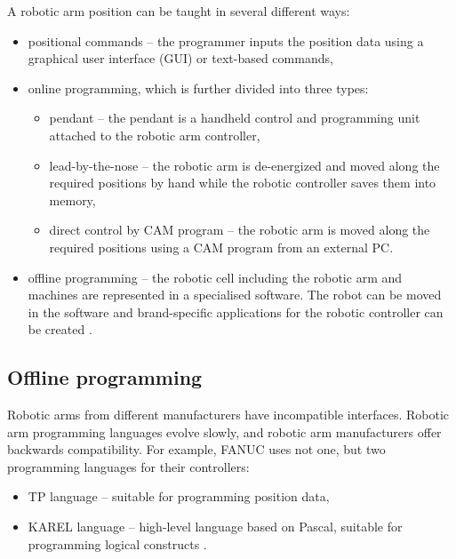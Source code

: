 A robotic arm position can be taught in several different ways:

\begin{itemize}
    \item positional commands -- the programmer inputs the position data using a graphical user interface (GUI) or text-based commands,
    
    \item online programming, which is further divided into three types:
    
    \begin{itemize}
    
    \item pendant -- the pendant is a handheld control and programming unit attached to the robotic arm controller,
    \item lead-by-the-nose -- the robotic arm is de-energized and moved along the required positions by hand while the robotic controller saves them into memory,
    \item direct control by CAM program -- the robotic arm is moved along the required positions using a CAM program from an external PC.
    
    \end{itemize}
    
    \item offline programming -- the robotic cell including the robotic arm and machines are represented in a specialised software. The robot can be moved in the software and brand-specific applications for the robotic controller can be created \cite{robodkmethods}.
  

\end{itemize}

\subsection{Offline programming}
Robotic arms from different manufacturers have incompatible interfaces. Robotic arm programming languages evolve slowly, and robotic arm manufacturers offer backwards compatibility. For example, FANUC uses not one, but two programming languages for their controllers: 

\begin{itemize}

 \item TP language -- suitable for programming position data,
 \item KAREL language -- high-level language based on Pascal, suitable for programming logical constructs \cite{fanuchandling}.

\end{itemize}

